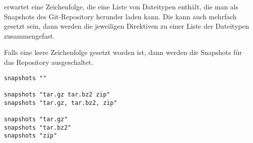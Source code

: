  erwartet eine Zeichenfolge, die eine Liste von Dateitypen
enthält, die man als Snapshots des Git-Repository herunder laden kann. Die
 kann auch mehrfach gesetzt sein, dann werden die
jeweiligen Direktiven zu einer Liste der Dateitypen zusammengefast.

Falls eine leere Zeichenfolge gesetzt worden ist, dann werden die Snapshots für
das Repository ausgeschaltet.

\begin{lstlisting}[style=Java, caption=Beispiele für die \directive{snapshots}]
snapshots ""

snapshots "tar.gz tar.bz2 zip"
snapshots "tar.gz, tar.bz2, zip"

snapshots "tar.gz"
snapshots "tar.bz2"
snapshots "zip"
\end{lstlisting}
